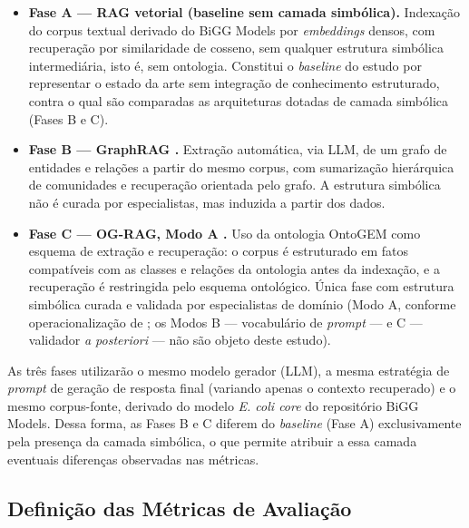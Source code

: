 \documentclass{article}
\begin{document}
	\begin{itemize}
		\item \textbf{Fase A --- RAG vetorial (baseline sem camada simbólica).} Indexação do corpus textual derivado do BiGG Models por \textit{embeddings} densos, com recuperação por similaridade de cosseno, sem qualquer estrutura simbólica intermediária, isto é, sem ontologia. Constitui o \textit{baseline} do estudo por representar o estado da arte sem integração de conhecimento estruturado, contra o qual são comparadas as arquiteturas dotadas de camada simbólica (Fases B e C). %
		\item \textbf{Fase B --- GraphRAG \cite{edge2024graphrag}.} Extração automática, via LLM, de um grafo de entidades e relações a partir do mesmo corpus, com sumarização hierárquica de comunidades e recuperação orientada pelo grafo. A estrutura simbólica não é curada por especialistas, mas induzida a partir dos dados.
		\item \textbf{Fase C --- OG-RAG, Modo A \cite{sharma2025ograg}.} Uso da ontologia OntoGEM \cite{souza2025ontogem} como esquema de extração e recuperação: o corpus é estruturado em fatos compatíveis com as classes e relações da ontologia antes da indexação, e a recuperação é restringida pelo esquema ontológico. Única fase com estrutura simbólica curada e validada por especialistas de domínio (Modo A, conforme operacionalização de \cite{sharma2025ograg}; os Modos B --- vocabulário de \textit{prompt} --- e C --- validador \textit{a posteriori} --- não são objeto deste estudo).
	\end{itemize}
	
	As três fases utilizarão o mesmo modelo gerador (LLM), a mesma estratégia de \textit{prompt} de geração de resposta final (variando apenas o contexto recuperado) e o mesmo corpus-fonte, derivado do modelo \textit{E. coli core} do repositório BiGG Models. Dessa forma, as Fases B e C diferem do \textit{baseline} (Fase A) exclusivamente pela presença da camada simbólica, o que permite atribuir a essa camada eventuais diferenças observadas nas métricas. %
	
	\subsection{Definição das Métricas de Avaliação} \label{sec:metricas} %
	
\end{document}
